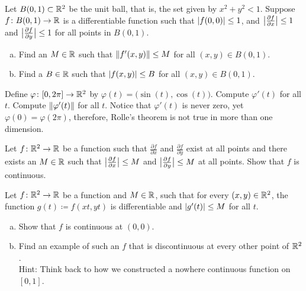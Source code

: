 \begin{exercise}
Let $B(0,1) \subset {\mathbb{R}}^2$ be the unit ball, that is, the set given by
$x^2 + y^2 < 1$.
Suppose $f \colon B(0,1) \to {\mathbb{R}}$ is a differentiable function
such that $\lvert {f(0,0)} \rvert \leq 1$,
and 
$\bigl\lvert {\frac{\partial f}{\partial x}} \bigr\rvert \leq 1$ and
$\bigl\lvert {\frac{\partial f}{\partial y}} \bigr\rvert \leq 1$ for all
points in $B(0,1)$.
\begin{enumerate}[a)]
\item
Find an $M \in {\mathbb{R}}$ such that $\lVert {f'(x,y)} \rVert \leq M$
for all $(x,y) \in
B(0,1)$.
\item
Find a $B \in {\mathbb{R}}$ such that
$\lvert {f(x,y)} \rvert \leq B$
for all $(x,y) \in
B(0,1)$.
\end{enumerate}
\end{exercise}

\begin{exercise}
Define $\varphi \colon [0,2\pi] \to {\mathbb{R}}^2$ by $\varphi(t) =
\bigl(\sin(t),\cos(t)\bigr)$.  Compute $\varphi'(t)$ for all $t$.  Compute
$\lVert {\varphi'(t)} \rVert$ for all $t$.  Notice that $\varphi'(t)$ is never zero,
yet $\varphi(0) = \varphi(2\pi)$, therefore, Rolle's theorem is not true
in more than one dimension.
\end{exercise}

\begin{exercise}
Let $f \colon {\mathbb{R}}^2 \to {\mathbb{R}}$ be a function such that
$\frac{\partial f}{\partial x}$ and
$\frac{\partial f}{\partial y}$ exist at all points and there exists an $M
\in {\mathbb{R}}$
such that 
$\bigl\lvert {\frac{\partial f}{\partial x}} \bigr\rvert \leq M$ and
$\bigl\lvert {\frac{\partial f}{\partial y}} \bigr\rvert \leq M$ at all points.  Show that $f$
is continuous.
\end{exercise}

\begin{samepage}
\begin{exercise}
Let $f \colon {\mathbb{R}}^2 \to {\mathbb{R}}$ be a function and
$M \in {\mathbb{R}}$, such that
for every $(x,y) \in {\mathbb{R}}^2$, the function $g(t) \coloneqq f(xt,yt)$ is
differentiable
and $\lvert {g'(t)} \rvert \leq M$ for all $t$.
\begin{enumerate}[a)]
\item
Show that $f$ is continuous at $(0,0)$.
\item
Find an example of such an $f$ that is discontinuous at every other point of
${\mathbb{R}}^2$.\\
Hint: Think back to how we constructed a nowhere continuous function on $[0,1]$.
\end{enumerate}
\end{exercise}
\end{samepage}

